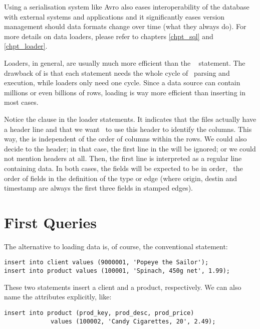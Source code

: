 Using a serialisation system like Avro also eases
interoperability of the database with
external systems and applications and it
significantly eases version management should data formats
change over time (what they always do). 
For more details on data loaders, please refer to chapters
\ref{chpt_sql} and \ref{chpt_loader}.

Loaders, in general, are usually much more efficient than
the \sql\  statement.
The drawback of  is that each statement
needs the whole cycle of \sql\ parsing and execution,
while loaders only need one cycle. Since a data source
can contain millions or even billions of rows,
loading is way more efficient than inserting in most cases.

Notice the  clause in the loader statements.
It indicates that the  files actually
have a header line and that we want \nowdb\ to use this header
to identify the columns.
This way, the  is independent
of the order of columns within the rows.
We could also decide to  the header;
in that case, the first line
in the  will be ignored;
or we could not mention headers at all.
Then, the first line is interpreted as a regular
line containing data.
In both cases, the fields will be expected to be
in  order, \ie\ the order of fields in
the definition of the type or edge (where
origin, destin and timestamp are always
the first three fields in stamped edges).

\section{First Queries}
The alternative to loading data is, of course, the conventional
 statement:

\begin{sqlcode}
\begin{lstlisting}
insert into client values (9000001, 'Popeye the Sailor');
insert into product values (100001, 'Spinach, 450g net', 1.99);
\end{lstlisting}
\end{sqlcode}

These two statements insert a client and a product, respectively.
We can also name the attributes explicitly, like:

\begin{sqlcode}
\begin{lstlisting}
insert into product (prod_key, prod_desc, prod_price)
             values (100002, 'Candy Cigarettes, 20', 2.49);
\end{lstlisting}
\end{sqlcode}

